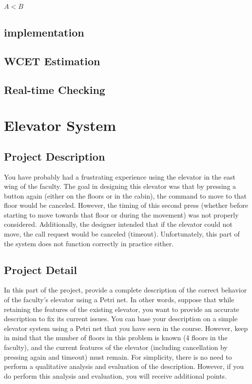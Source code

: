 \documentclass[12pt	]{article}
\begin{document}
$A < B$
















\subsection{implementation}
\subsection{WCET Estimation}
\subsection{Real-time Checking}











\newpage

\section{Elevator System}


\subsection{Project Description}
You have probably had a frustrating experience using the elevator in the east wing of the faculty. The goal in designing this elevator was that by pressing a button again (either on the floors or in the cabin), the command to move to that floor would be canceled. However, the timing of this second press (whether before starting to move towards that floor or during the movement) was not properly considered. Additionally, the designer intended that if the elevator could not move, the call request would be canceled (timeout). Unfortunately, this part of the system does not function correctly in practice either.



\subsection{Project Detail}
In this part of the project, provide a complete description of the correct behavior of the faculty's elevator using a Petri net. In other words, suppose that while retaining the features of the existing elevator, you want to provide an accurate description to fix its current issues. You can base your description on a simple elevator system using a Petri net that you have seen in the course. However, keep in mind that the number of floors in this problem is known (4 floors in the faculty), and the current features of the elevator (including cancellation by pressing again and timeout) must remain. For simplicity, there is no need to perform a qualitative analysis and evaluation of the description. However, if you do perform this analysis and evaluation, you will receive additional points.
\end{document}
